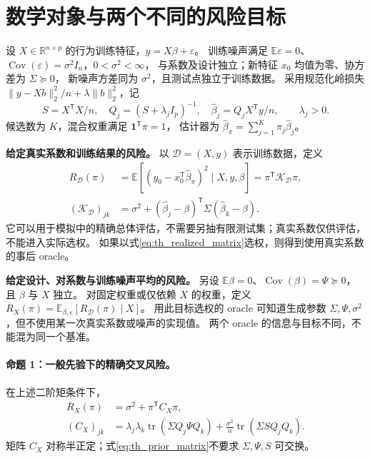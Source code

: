\section{数学对象与两个不同的风险目标}\label{sec:theory_setup}
设 $X\in\mathbb R^{n\times p}$ 的行为训练特征，$y=X\beta+\varepsilon$。
训练噪声满足 $\mathbb E\varepsilon=0$、$\operatorname{Cov}(\varepsilon)=\sigma^2I_n$，$0<\sigma^2<\infty$，
与系数及设计独立；新特征 $x_0$ 均值为零、协方差为 $\Sigma\succeq0$，
新噪声方差同为 $\sigma^2$，且测试点独立于训练数据。
采用规范化岭损失 $\lVert y-Xb\rVert_2^2/n+\lambda\lVert b\rVert_2^2$，记
\begin{equation}\label{eq:th_ridge}
 S=X^{\mathsf T}X/n,\quad Q_j=(S+\lambda_jI_p)^{-1},\quad
 \widehat\beta_j=Q_jX^{\mathsf T}y/n,\qquad \lambda_j>0.
\end{equation}
候选数为 $K$，混合权重满足 $\boldsymbol1^{\mathsf T}\pi=1$，
估计器为 $\widehat\beta_\pi=\sum_{j=1}^K\pi_j\widehat\beta_j$。

\textbf{给定真实系数和训练结果的风险。}
以 $\mathcal D=(X,y)$ 表示训练数据，定义
\begin{align}
 R_{\mathcal D}(\pi)
 &=\mathbb E[(y_0-x_0^{\mathsf T}\widehat\beta_\pi)^2\mid X,y,\beta]
 =\pi^{\mathsf T}\mathcal K_{\mathcal D}\pi,\label{eq:th_realized_risk}\\
 (\mathcal K_{\mathcal D})_{jk}
 &=\sigma^2+(\widehat\beta_j-\beta)^{\mathsf T}\Sigma(\widehat\beta_k-\beta).
 \label{eq:th_realized_matrix}
\end{align}
它可以用于模拟中的精确总体评估，不需要另抽有限测试集；真实系数仅供评估，不能进入实际选权。
如果以式\eqref{eq:th_realized_matrix}选权，则得到使用真实系数的事后 oracle。

\textbf{给定设计、对系数与训练噪声平均的风险。}
另设 $\mathbb E\beta=0$、$\operatorname{Cov}(\beta)=\Psi\succeq0$，且 $\beta$ 与 $X$ 独立。
对固定权重或仅依赖 $X$ 的权重，定义
$\overline R_X(\pi)=\mathbb E_{\beta,\varepsilon}[R_{\mathcal D}(\pi)\mid X]$。
用此目标选权的 oracle 可知道生成参数 $\Sigma,\Psi,\sigma^2$，但不使用某一次真实系数或噪声的实现值。
两个 oracle 的信息与目标不同，不能混为同一个基准。

\paragraph{命题 1：一般先验下的精确交叉风险。}
在上述二阶矩条件下，
\begin{align}
 \overline R_X(\pi)&=\sigma^2+\pi^{\mathsf T}C_X\pi,\label{eq:th_prior_risk}\\
 (C_X)_{jk}
 &=\lambda_j\lambda_k\operatorname{tr}(\Sigma Q_j\Psi Q_k)
   +\frac{\sigma^2}{n}\operatorname{tr}(\Sigma SQ_jQ_k).
 \label{eq:th_prior_matrix}
\end{align}
矩阵 $C_X$ 对称半正定；式\eqref{eq:th_prior_matrix}不要求 $\Sigma,\Psi,S$ 可交换。

